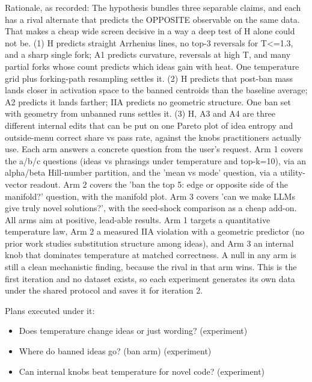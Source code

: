 \documentclass[11pt,letterpaper]{article}
\begin{document}
Rationale, as recorded: The hypothesis bundles three separable claims, and each has a rival alternate that predicts the OPPOSITE observable on the same data. That makes a cheap wide screen decisive in a way a deep test of H alone could not be. (1) H predicts straight Arrhenius lines, no top-3 reversals for T\textless{}=1.3, and a sharp single fork; A1 predicts curvature, reversals at high T, and many partial forks whose count predicts which ideas gain with heat. One temperature grid plus forking-path resampling settles it. (2) H predicts that post-ban mass lands closer in activation space to the banned centroids than the baseline average; A2 predicts it lands farther; IIA predicts no geometric structure. One ban set with geometry from unbanned runs settles it. (3) H, A3 and A4 are three different internal edits that can be put on one Pareto plot of idea entropy and outside-menu correct share vs pass rate, against the knobs practitioners actually use. Each arm answers a concrete question from the user's request. Arm 1 covers the a/b/c questions (ideas vs phrasings under temperature and top-k=10), via an alpha/beta Hill-number partition, and the 'mean vs mode' question, via a utility-vector readout. Arm 2 covers the 'ban the top 5: edge or opposite side of the manifold?' question, with the manifold plot. Arm 3 covers 'can we make LLMs give truly novel solutions?', with the seed-shock comparison as a cheap add-on. All arms aim at positive, lead-able results. Arm 1 targets a quantitative temperature law, Arm 2 a measured IIA violation with a geometric predictor (no prior work studies substitution structure among ideas), and Arm 3 an internal knob that dominates temperature at matched correctness. A null in any arm is still a clean mechanistic finding, because the rival in that arm wins. This is the first iteration and no dataset exists, so each experiment generates its own data under the shared protocol and saves it for iteration 2.

Plans executed under it:

\begin{itemize}

\item Does temperature change ideas or just wording? (experiment)

\item Where do banned ideas go? (ban arm) (experiment)

\item Can internal knobs beat temperature for novel code? (experiment)

\end{itemize}
\end{document}

